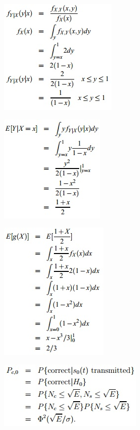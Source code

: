 \documentclass[11pt,landscape]{article}
\begin{document}
\begin{multicols}{3}
\begin{figure}[H]
\end{figure}
\begin{figure}[H]
    \includegraphics[scale=0.75]{./Images/2/sleep1.jpg}
\end{figure}
\begin{figure}[H]
    \includegraphics[scale=0.75]{./Images/2/sleep2.jpg}
\end{figure}
\begin{figure}[H]
    \includegraphics[scale=0.75]{./Images/2/sleep3.jpg}
\end{figure}
\begin{figure}[H]
    \includegraphics[scale=0.75]{./Images/2/hw7_1.jpg}
\end{figure}

\end{multicols}
\end{document}
